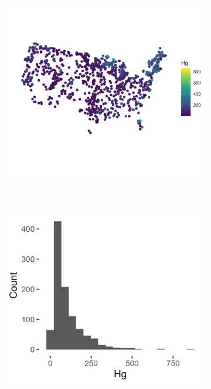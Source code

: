\documentclass[]{elsarticle} %
\begin{document}
\begin{figure}
\centering
\begin{subfigure}{0.98\textwidth}
  \centering
  \includegraphics[width = 1\linewidth]{figures/mercury_map.jpeg}
  \caption*{}
  \label{fig:mercury_map}
\end{subfigure} \\
\begin{subfigure}{0.49\textwidth}
  \centering
  \includegraphics[width = 1\linewidth]{figures/mercury_hist.jpeg}

\end{subfigure}
\end{figure}
\end{document}
